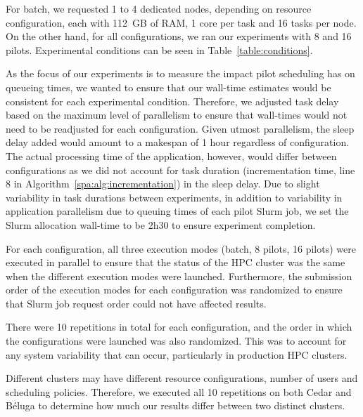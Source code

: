 	   For batch, we requested 1 to 4 dedicated nodes, depending on resource 
	   configuration, each with 112~GB of RAM, 1 core per task and 16 tasks per 
	   node. On the other hand, for all configurations, we ran our experiments
	   with 8 and 16 pilots. Experimental conditions can be seen in Table~\ref{table:conditions}.
    
	   As the focus of our experiments is to measure the impact pilot scheduling
	   has on queueing times, we wanted to ensure that our wall-time estimates would
	   be consistent for each experimental condition. Therefore, we adjusted task 
	   delay based on the maximum level of parallelism to ensure that wall-times would
	   not need to be readjusted for each configuration. Given utmost parallelism,
	   the sleep delay added would amount to a makespan of 1 hour regardless
	   of configuration. The actual processing time of the application, however, 
	   would differ between configurations as we did not account for task duration (incrementation time, line
	   8 in Algorithm~\ref{spa:alg:incrementation})
	   in the sleep delay. Due to slight variability in task durations between experiments, in 
	   addition to variability in application parallelism due to queuing times of each pilot Slurm job, 
	   we set the Slurm allocation wall-time to be 2h30 to ensure experiment completion.
    
	   For each configuration, all three execution modes (batch, 8 pilots,
	   16 pilots) were executed in parallel to ensure that the status of
	   the HPC cluster was the same when the different execution modes
	   were launched. Furthermore, the submission order of the execution
	   modes for each configuration was randomized to ensure that Slurm job
	   request order could not have affected results. 
    
	   There were 10 repetitions in total for each configuration, and the order
	   in which the configurations were launched was also randomized. This was to 
	   account for any system variability that can occur, particularly in production
	   HPC clusters. 
    
	   Different clusters may have different resource configurations, number of 
	   users and scheduling policies. Therefore, we executed all 10 repetitions on
	   both Cedar and B\'eluga to determine how much our results differ between
	   two distinct clusters.
    
    
